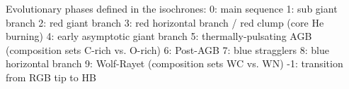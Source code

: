  Evolutionary phases defined in the isochrones:
0: main sequence
1: sub giant branch
2: red giant branch
3: red horizontal branch / red clump (core He burning)
4: early asymptotic giant branch
5: thermally-pulsating AGB (composition sets C-rich vs. O-rich)
6: Post-AGB
7: blue stragglers
8: blue horizontal branch
9: Wolf-Rayet (composition sets WC vs. WN)
-1: transition from RGB tip to HB
